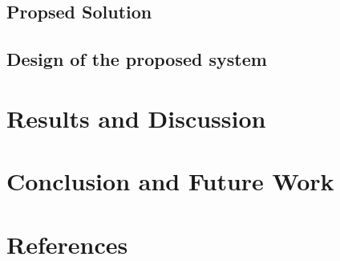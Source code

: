 \hypertarget{propsed-solution}{%
\subsection{Propsed Solution}\label{propsed-solution}}

\hypertarget{design-of-the-proposed-system}{%
\subsection{Design of the proposed
system}\label{design-of-the-proposed-system}}

\hypertarget{results-and-discussion}{%
\section{Results and Discussion}\label{results-and-discussion}}

\hypertarget{conclusion-and-future-work}{%
\section{Conclusion and Future Work}\label{conclusion-and-future-work}}

\hypertarget{references}{%
\section{References}\label{references}}
